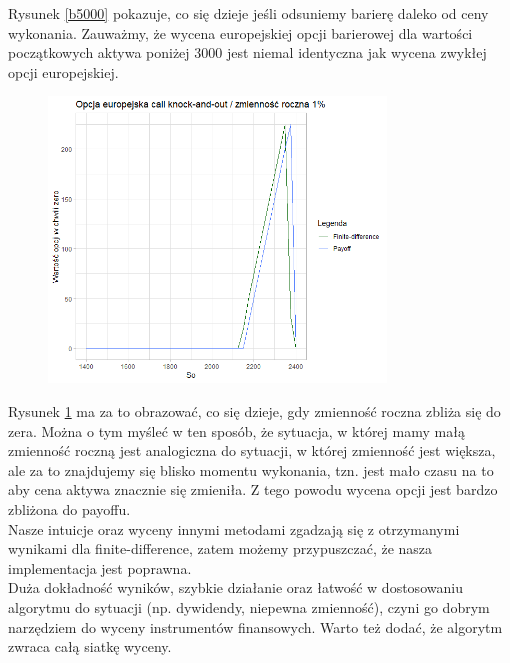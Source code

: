 \documentclass[12pt]{article}
\begin{document}
Rysunek \ref{b5000} pokazuje, co się dzieje jeśli odsuniemy barierę daleko od ceny wykonania. Zauważmy, że wycena europejskiej opcji barierowej dla wartości początkowych aktywa poniżej \(3000\) jest niemal identyczna jak wycena zwykłej opcji europejskiej.\\

\begin{figure}[H]
    \centering
    \includegraphics[width=0.8\textwidth,height=\textheight,keepaspectratio]{ec_sigma0.png}
    \caption{}
    \label{sigma0}
\end{figure}

Rysunek \ref{sigma0} ma za to obrazować, co się dzieje, gdy zmienność roczna zbliża się do zera. Można o tym myśleć w ten sposób, że sytuacja, w której mamy małą zmienność roczną jest analogiczna do sytuacji, w której zmienność jest większa, ale za to znajdujemy się blisko momentu wykonania, tzn. jest mało czasu na to aby cena aktywa znacznie się zmieniła. Z tego powodu wycena opcji jest bardzo zbliżona do payoffu.\\

Nasze intuicje oraz wyceny innymi metodami zgadzają się z otrzymanymi wynikami dla finite-difference, zatem możemy przypuszczać, że nasza implementacja jest poprawna.\\ 


Duża dokładność wyników, szybkie działanie oraz łatwość w dostosowaniu algorytmu do sytuacji (np. dywidendy, niepewna zmienność), czyni go dobrym narzędziem do wyceny instrumentów finansowych. Warto też dodać, że algorytm zwraca całą siatkę wyceny.
\end{document}

